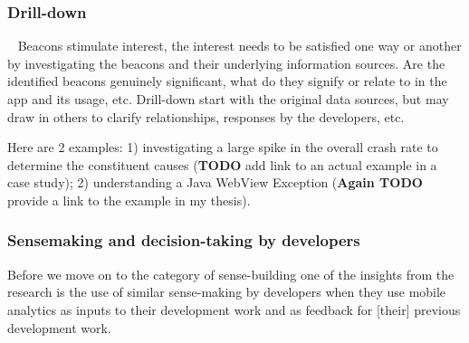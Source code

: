 
 




\subsubsection{Drill-down}~\label{drill-down-research-method}
Beacons stimulate interest, the interest needs to be satisfied one way or another by investigating the beacons and their underlying information sources. 
Are the identified beacons genuinely significant, what do they signify or relate to in the app and its usage, etc.  Drill-down start with the original data sources, but may draw in others to clarify relationships, responses by the developers, etc.

 

Here are 2 examples: 1) investigating a large spike in the overall crash rate to determine the constituent causes (\textbf{TODO} add link to an actual example in a case study); 2) understanding a Java WebView Exception (\textbf{Again TODO} provide a link to the example in my thesis). 


\subsubsection{Sensemaking and decision-taking by developers}
Before we move on to the category of sense-building one of the insights from the research is the use of similar sense-making by developers when they use mobile analytics as inputs to their development work and as feedback for [their] previous development work.

